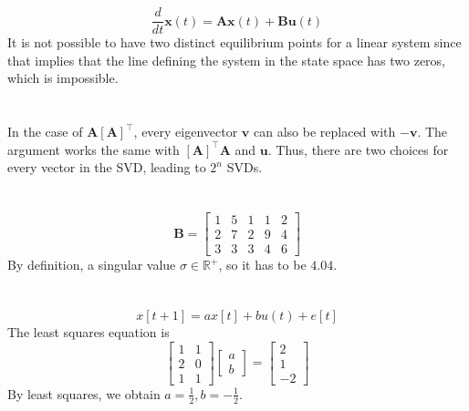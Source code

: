 \documentclass[]{article}
\newcommand{\tpose}[1]{\left[#1\right]^{\! \top} \!\!}
\newcommand{\diff}[1]{\frac{d}{d #1}}
\begin{document}
\section{}

\begin{equation}
	\diff{t} \bm{x}(t) = \bm{Ax}(t) + \bm{Bu}(t)
\end{equation}
It is not possible to have two distinct equilibrium points for a linear system since that implies that the line defining the system in the state space has two zeros, which is impossible.

\section{}

In the case of \(\bm{A}\tpose{\bm{A}}\), every eigenvector \(\bm{v}\) can also be replaced with \(-\bm{v}\).
The argument works the same with \(\tpose{\bm{A}}\bm{A}\) and \(\bm{u}\).
Thus, there are two choices for every vector in the SVD, leading to \(2^n\) SVDs.

\section{}

\begin{equation}
	\bm{B} =
	\begin{bmatrix}
	1 & 5 & 1 & 1 & 2 \\
	2 & 7 & 2 & 9 & 4 \\
	3 & 3 & 3 & 4 & 6
	\end{bmatrix}
\end{equation}
By definition, a singular value \(\sigma \in \mathbb{R}^+\), so it has to be \(4.04\).

\section{}

\begin{equation}
	x[t + 1] = a x[t] + b u(t) + e[t]
\end{equation}
The least squares equation is
\begin{equation}
	\begin{bmatrix}
	1 & 1 \\
	2 & 0 \\
	1 & 1
	\end{bmatrix}
	\begin{bmatrix}
	a \\
	b
	\end{bmatrix} =
	\begin{bmatrix}
	2 \\
	1 \\
	-2
	\end{bmatrix}
\end{equation}
By least squares, we obtain \(a = \frac{1}{2}, b = -\frac{1}{2}\).
\end{document}
